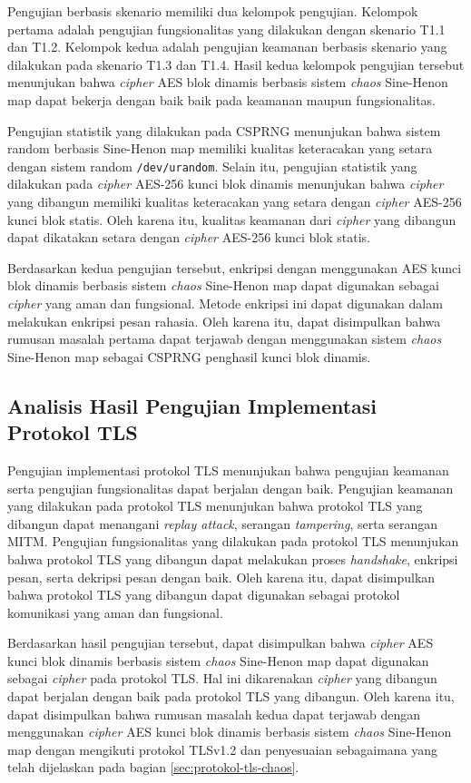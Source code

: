 Pengujian berbasis skenario memiliki dua kelompok pengujian. Kelompok pertama adalah pengujian fungsionalitas yang dilakukan dengan skenario T1.1 dan T1.2. Kelompok kedua adalah pengujian keamanan berbasis skenario yang dilakukan pada skenario T1.3 dan T1.4. Hasil kedua kelompok pengujian tersebut menunjukan bahwa \emph{cipher} AES blok dinamis berbasis sistem \emph{chaos} Sine-Henon map dapat bekerja dengan baik baik pada keamanan maupun fungsionalitas.

Pengujian statistik yang dilakukan pada CSPRNG menunjukan bahwa sistem random berbasis Sine-Henon map memiliki kualitas keteracakan yang setara dengan sistem random \texttt{/dev/urandom}. Selain itu, pengujian statistik yang dilakukan pada \emph{cipher} AES-256 kunci blok dinamis menunjukan bahwa \emph{cipher} yang dibangun memiliki kualitas keteracakan yang setara dengan \emph{cipher} AES-256 kunci blok statis. Oleh karena itu, kualitas keamanan dari \emph{cipher} yang dibangun dapat dikatakan setara dengan \emph{cipher} AES-256 kunci blok statis.

Berdasarkan kedua pengujian tersebut, enkripsi dengan menggunakan AES kunci blok dinamis berbasis sistem \emph{chaos} Sine-Henon map dapat digunakan sebagai \emph{cipher} yang aman dan fungsional. Metode enkripsi ini dapat digunakan dalam melakukan enkripsi pesan rahasia. Oleh karena itu, dapat disimpulkan bahwa rumusan masalah pertama dapat terjawab dengan menggunakan sistem \emph{chaos} Sine-Henon map sebagai CSPRNG penghasil kunci blok dinamis.

\subsection{Analisis Hasil Pengujian Implementasi Protokol TLS}

Pengujian implementasi protokol TLS menunjukan bahwa pengujian keamanan serta pengujian fungsionalitas dapat berjalan dengan baik. Pengujian keamanan yang dilakukan pada protokol TLS menunjukan bahwa protokol TLS yang dibangun dapat menangani \emph{replay attack}, serangan \emph{tampering}, serta serangan MITM.  Pengujian fungsionalitas yang dilakukan pada protokol TLS menunjukan bahwa protokol TLS yang dibangun dapat melakukan proses \emph{handshake}, enkripsi pesan, serta dekripsi pesan dengan baik. Oleh karena itu, dapat disimpulkan bahwa protokol TLS yang dibangun dapat digunakan sebagai protokol komunikasi yang aman dan fungsional.

Berdasarkan hasil pengujian tersebut, dapat disimpulkan bahwa \emph{cipher} AES kunci blok dinamis berbasis sistem \emph{chaos} Sine-Henon map dapat digunakan sebagai \emph{cipher} pada protokol TLS. Hal ini dikarenakan \emph{cipher} yang dibangun dapat berjalan dengan baik pada protokol TLS yang dibangun. Oleh karena itu, dapat disimpulkan bahwa rumusan masalah kedua dapat terjawab dengan menggunakan \emph{cipher} AES kunci blok dinamis berbasis sistem \emph{chaos} Sine-Henon map dengan mengikuti protokol TLSv1.2 dan penyesuaian sebagaimana yang telah dijelaskan pada bagian \ref{sec:protokol-tls-chaos}.


